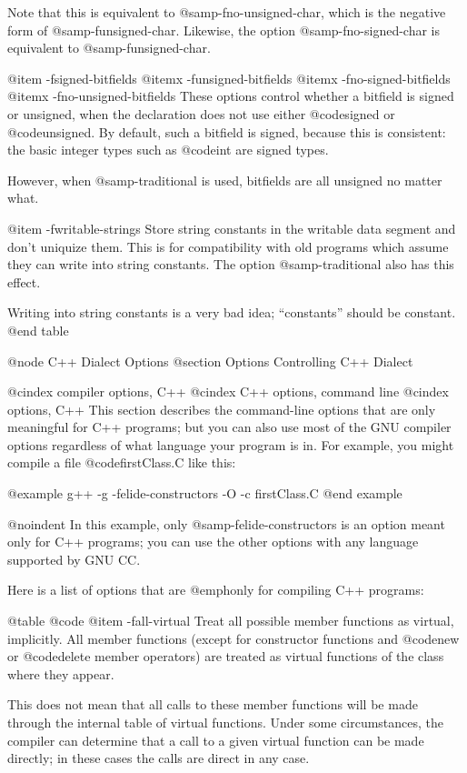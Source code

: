 {Note that this is equivalent to @samp{-fno-unsigned-char}, which is
the negative form of @samp{-funsigned-char}.  Likewise, the option
@samp{-fno-signed-char} is equivalent to @samp{-funsigned-char}.

@item -fsigned-bitfields
@itemx -funsigned-bitfields
@itemx -fno-signed-bitfields
@itemx -fno-unsigned-bitfields
These options control whether a bitfield is signed or unsigned, when the
declaration does not use either @code{signed} or @code{unsigned}.  By
default, such a bitfield is signed, because this is consistent: the
basic integer types such as @code{int} are signed types.

However, when @samp{-traditional} is used, bitfields are all unsigned
no matter what.

@item -fwritable-strings
Store string constants in the writable data segment and don't uniquize
them.  This is for compatibility with old programs which assume they can
write into string constants.  The option @samp{-traditional} also has
this effect.

Writing into string constants is a very bad idea; ``constants'' should
be constant.
@end table

@node C++ Dialect Options
@section Options Controlling C++ Dialect

@cindex compiler options, C++
@cindex C++ options, command line
@cindex options, C++
This section describes the command-line options that are only meaningful
for C++ programs; but you can also use most of the GNU compiler options
regardless of what language your program is in.  For example, you
might compile a file @code{firstClass.C} like this:

@example
g++ -g -felide-constructors -O -c firstClass.C
@end example

@noindent
In this example, only @samp{-felide-constructors} is an option meant
only for C++ programs; you can use the other options with any
language supported by GNU CC.

Here is a list of options that are @emph{only} for compiling C++ programs:

@table @code
@item -fall-virtual
Treat all possible member functions as virtual, implicitly.
All member functions (except for constructor functions and @code{new} or
@code{delete} member operators) are treated as virtual functions of the
class where they appear.

This does not mean that all calls to these member functions will be made
through the internal table of virtual functions.  Under some
circumstances, the compiler can determine that a call to a given virtual
function can be made directly; in these cases the calls are direct in
any case.

}
